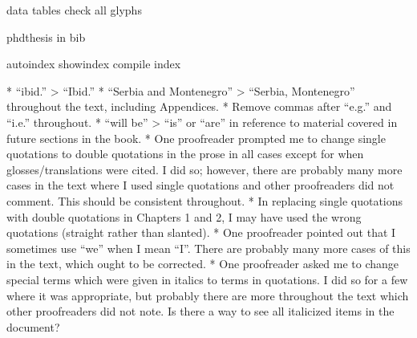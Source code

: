data 
tables
check all glyphs  

phdthesis in bib

autoindex
showindex
compile index

  *   “ibid.” > “Ibid.”
  *   “Serbia and Montenegro” > “Serbia, Montenegro” throughout the text, including Appendices.
  *   Remove commas after “e.g.” and “i.e.” throughout.
  *   “will be” > “is” or “are” in reference to material covered in future sections in the book.
  * One proofreader prompted me to change single quotations to double quotations in the prose in all cases except for when glosses/translations were cited. I did so; however, there are probably many more cases in the text where I used single quotations and other proofreaders did not comment. This should be consistent throughout.
  *   In replacing single quotations with double quotations in Chapters 1 and 2, I may have used the wrong quotations (straight rather than slanted).
  *   One proofreader pointed out that I sometimes use “we” when I mean “I”. There are probably many more cases of this in the text, which ought to be corrected.
  *   One proofreader asked me to change special terms which were given in italics to terms in quotations. I did so for a few where it was appropriate, but probably there are more throughout the text which other proofreaders did not note. Is there a way to see all italicized items in the document?
